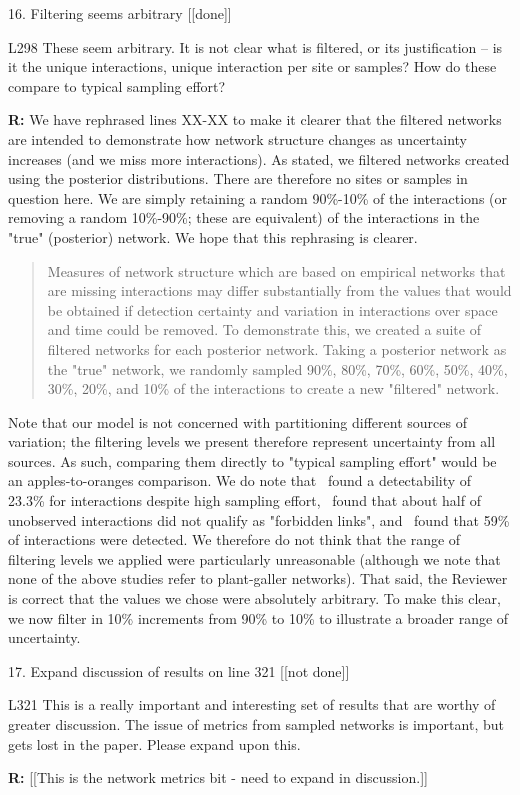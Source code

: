 \documentclass[12pt]{letter}
\newenvironment{refquote}{\bigskip \begin{it}}{\end{it}\smallskip}
\begin{document}
	16. Filtering seems arbitrary [[done]]

		\begin{refquote}
		L298 These seem arbitrary. It is not clear what is filtered, or its justification – is it the unique interactions, unique interaction per site or samples? How do these compare to typical sampling effort?
		\end{refquote}

		\textbf{R:} We have rephrased lines XX-XX to make it clearer that the filtered networks are intended to demonstrate how network structure changes as uncertainty increases (and we miss more interactions). As stated, we filtered networks created using the posterior distributions. There are therefore no sites or samples in question here. We are simply retaining a random 90\%-10\% of the interactions (or removing a random 10\%-90\%; these are equivalent) of the interactions in the "true" (posterior) network. We hope that this rephrasing is clearer. 

			\begin{quotation}
				Measures of network structure which are based on empirical networks that are missing interactions may differ substantially from the values that would be obtained if detection certainty and variation in interactions over space and time could be removed. To demonstrate this, we created a suite of filtered networks for each posterior network. Taking a posterior network as the "true" network, we randomly sampled 90\%, 80\%, 70\%, 60\%, 50\%, 40\%, 30\%, 20\%, and 10\% of the interactions to create a new "filtered" network.
			\end{quotation}


		Note that our model is not concerned with partitioning different sources of variation; the filtering levels we present therefore represent uncertainty from all sources. As such, comparing them directly to "typical sampling effort" would be an apples-to-oranges comparison. We do note that~\citet{Weinstein2017a} found a detectability of 23.3\% for interactions despite high sampling effort,~\citet{Jordano2016} found that about half of unobserved interactions did not qualify as "forbidden links", and~\citet{Bartomeus2013} found that 59\% of interactions were detected. We therefore do not think that the range of filtering levels we applied were particularly unreasonable (although we note that none of the above studies refer to plant-galler networks). That said, the Reviewer is correct that the values we chose were absolutely arbitrary. To make this clear, we now filter in 10\% increments from 90\% to 10\% to illustrate a broader range of uncertainty.


	17. Expand discussion of results on line 321 [[not done]]

		\begin{refquote}
		L321 This is a really important and interesting set of results that are worthy of greater discussion. The issue of metrics from sampled networks is important, but gets lost in the paper. Please expand upon this.
		\end{refquote}

		\textbf{R:} [[This is the network metrics bit - need to expand in discussion.]]


\clearpage
\end{document}
